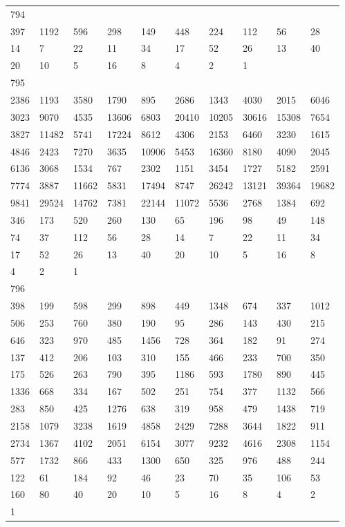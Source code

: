 \begin{longtable}{*{10}{l}}
794&&&&&&&&&\\
397& 1192& 596& 298& 149& 448& 224& 112& 56& 28\\
14& 7& 22& 11& 34& 17& 52& 26& 13& 40\\
20& 10& 5& 16& 8& 4& 2& 1& \\

795&&&&&&&&&\\
2386& 1193& 3580& 1790& 895& 2686& 1343& 4030& 2015& 6046\\
3023& 9070& 4535& 13606& 6803& 20410& 10205& 30616& 15308& 7654\\
3827& 11482& 5741& 17224& 8612& 4306& 2153& 6460& 3230& 1615\\
4846& 2423& 7270& 3635& 10906& 5453& 16360& 8180& 4090& 2045\\
6136& 3068& 1534& 767& 2302& 1151& 3454& 1727& 5182& 2591\\
7774& 3887& 11662& 5831& 17494& 8747& 26242& 13121& 39364& 19682\\
9841& 29524& 14762& 7381& 22144& 11072& 5536& 2768& 1384& 692\\
346& 173& 520& 260& 130& 65& 196& 98& 49& 148\\
74& 37& 112& 56& 28& 14& 7& 22& 11& 34\\
17& 52& 26& 13& 40& 20& 10& 5& 16& 8\\
4& 2& 1& \\

796&&&&&&&&&\\
398& 199& 598& 299& 898& 449& 1348& 674& 337& 1012\\
506& 253& 760& 380& 190& 95& 286& 143& 430& 215\\
646& 323& 970& 485& 1456& 728& 364& 182& 91& 274\\
137& 412& 206& 103& 310& 155& 466& 233& 700& 350\\
175& 526& 263& 790& 395& 1186& 593& 1780& 890& 445\\
1336& 668& 334& 167& 502& 251& 754& 377& 1132& 566\\
283& 850& 425& 1276& 638& 319& 958& 479& 1438& 719\\
2158& 1079& 3238& 1619& 4858& 2429& 7288& 3644& 1822& 911\\
2734& 1367& 4102& 2051& 6154& 3077& 9232& 4616& 2308& 1154\\
577& 1732& 866& 433& 1300& 650& 325& 976& 488& 244\\
122& 61& 184& 92& 46& 23& 70& 35& 106& 53\\
160& 80& 40& 20& 10& 5& 16& 8& 4& 2\\
1& \\


\end{longtable}
